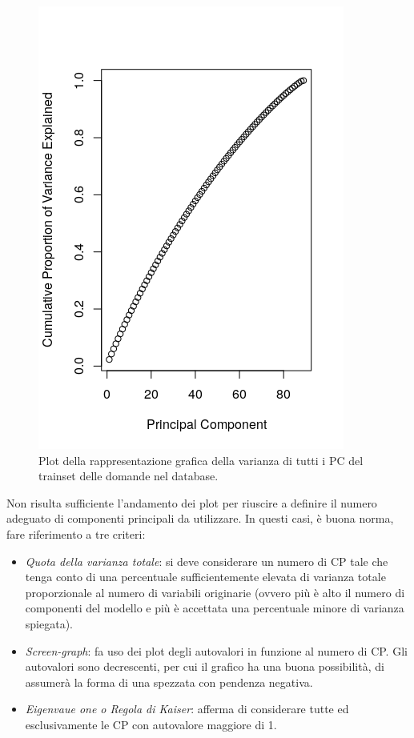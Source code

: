 \begin{figure}[H]
\centering
	\includegraphics[width=0.60\linewidth]{../../PCA/plot/variances2-ALL_rete-db.png}
	\caption{Plot della rappresentazione grafica della varianza di tutti i PC del trainset delle domande nel database.}
	\label{Plot della rappresentazione grafica della varianza di tutti i PC del trainset delle domande nel database.}
\end{figure}
Non risulta sufficiente l'andamento dei plot per riuscire a definire il numero adeguato di componenti principali da utilizzare. In questi casi, \`e buona norma, fare riferimento a tre criteri:
\begin{itemize}
\item \textit{Quota della varianza totale}: si deve considerare un numero di CP tale che tenga conto di una percentuale sufficientemente elevata di varianza totale proporzionale al numero di variabili originarie (ovvero pi\`u \`e alto il numero di componenti del modello e pi\`u \`e accettata una percentuale minore di varianza spiegata).
\item \textit{Screen-graph}: fa uso dei plot degli autovalori in funzione al numero di CP. Gli autovalori sono decrescenti, per cui il grafico ha una buona possibilit\`a, di assumer\`a la forma di una spezzata con pendenza negativa.
\item \textit{Eigenvaue one o Regola di Kaiser}: afferma di considerare tutte ed esclusivamente le CP con autovalore maggiore di 1.
\end{itemize}
